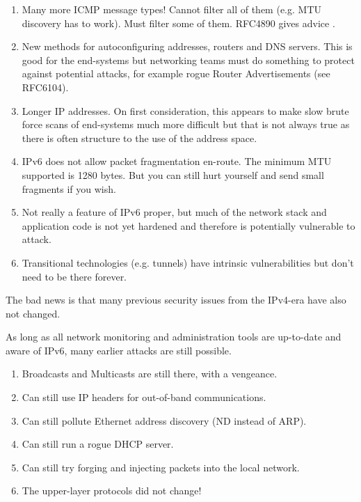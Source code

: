\begin{enumerate}

\item Many more ICMP message types! Cannot filter all of them (e.g. MTU discovery has to work). Must filter some of them. RFC4890 gives advice \cite{rfc}.

\item New methods for autoconfiguring addresses, routers and DNS servers. This is good for the end-systems but networking teams must do something to protect against potential attacks, for example rogue Router Advertisements (see RFC6104).

\item Longer IP addresses. On first consideration, this appears to make slow brute force scans of end-systems much more difficult but that is not always true as there is often structure to the use of the address space. 

\item IPv6 does not allow packet fragmentation en-route.  The minimum MTU supported is 1280 bytes. But you can still hurt yourself and send small fragments if you wish. 

\item Not really a feature of IPv6 proper, but much of the network stack and application code is not yet hardened and therefore is potentially vulnerable to attack.

\item Transitional technologies (e.g. tunnels) have intrinsic vulnerabilities but don't need to be there forever.

\end{enumerate}

The bad news is that many previous security issues from the IPv4-era have also not changed. 

As long as all network monitoring and administration tools are up-to-date and aware of IPv6, many earlier attacks are still possible.

\begin {enumerate}

\item Broadcasts and Multicasts are still there, with a vengeance.
\item Can still use IP headers for out-of-band communications.
\item Can still pollute Ethernet address discovery (ND instead of ARP).
\item Can still run a rogue DHCP server.
\item Can still try forging and injecting packets into the local network. 
\item The upper-layer protocols did not change!

\end {enumerate}




